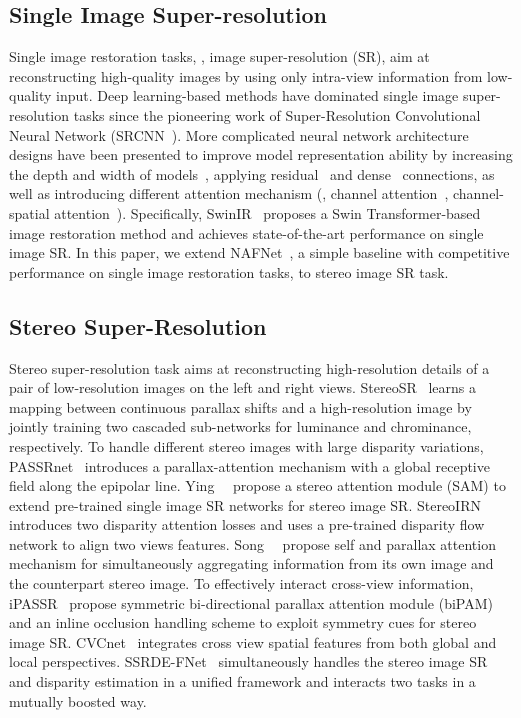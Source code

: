 \documentclass[10pt,twocolumn,letterpaper]{article}
\begin{document}
\subsection{Single Image Super-resolution}
Single image restoration tasks, \eg, image super-resolution (SR), aim at reconstructing high-quality images by using only intra-view information from low-quality input.
Deep learning-based methods have dominated single image super-resolution tasks since the pioneering work of Super-Resolution Convolutional Neural Network (SRCNN~\cite{dong2014learning}).
More complicated neural network architecture designs have been presented to improve model representation ability by increasing the depth and width of models~\cite{kim2016accurate}, applying residual~\cite{lim2017enhanced, zhang2018image} and dense~\cite{zhang2018residual} connections, as well as introducing different attention mechanism (\eg, channel attention~\cite{zhang2018image, dai2019second, magid2021dynamic}, channel-spatial attention~\cite{dai2019image, niu2020single, mei2021image, liang2021swinir}). 
Specifically, SwinIR~\cite{liang2021swinir} proposes a Swin Transformer-based image restoration method and achieves state-of-the-art performance on single image SR.
In this paper, we extend NAFNet~\cite{chen2022simple}, a simple baseline with competitive performance on single image restoration tasks, to stereo image SR task.


\subsection{Stereo Super-Resolution}
Stereo super-resolution task aims at reconstructing high-resolution details of a pair of low-resolution images on the left and right views.
StereoSR~\cite{jeon2018enhancing} learns a mapping between continuous parallax shifts and a high-resolution image by jointly training two cascaded sub-networks for luminance and chrominance, respectively. 
To handle different stereo images with large disparity variations, PASSRnet~\cite{wang2019learning} introduces a parallax-attention mechanism with a global receptive field along the epipolar line.
Ying~\etal~\cite{ying2020stereo} propose a stereo attention module (SAM) to extend pre-trained single image SR networks for stereo image SR. 
StereoIRN~\cite{yan2020disparity} introduces two disparity attention losses and uses a pre-trained disparity flow network to align two views features.
Song~\etal~\cite{song2020stereoscopic} propose self and parallax attention mechanism for simultaneously aggregating information from its own image and the counterpart stereo image.
To effectively interact cross-view information, iPASSR~\cite{wang2021symmetric} propose symmetric bi-directional parallax attention module (biPAM) and an inline occlusion handling scheme to exploit symmetry cues for stereo image SR.
CVCnet~\cite{zhu2021cross} integrates cross view spatial features from both global and local perspectives.
SSRDE-FNet~\cite{dai2021feedback} simultaneously handles the stereo image SR and disparity estimation in a unified framework and interacts two tasks in a mutually boosted way. 
\end{document}

